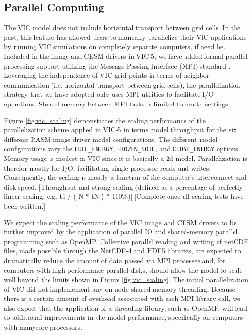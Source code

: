 \documentclass[gmd, manuscript]{copernicus}
\begin{document}
  \subsection{Parallel Computing}
    \label{sec:mpi}
    The VIC model does not include horizontal transport between grid cells.
    In the past, this feature has allowed users to manually parallelize their VIC applications by running VIC simulations on completely separate computers, if need be.
    Included in the image and CESM drivers in VIC-5, we have added formal parallel processing support utilizing the Message Passing Interface (MPI) standard \citep{Gropp_1996}.
    Leveraging the independence of VIC grid points in terms of neighbor communication (i.e. horizontal transport between grid cells), the parallelization strategy that we have adopted only uses MPI utilities to facilitate I/O operations.
    Shared memory between MPI tasks is limited to model settings.

    Figure \ref{fig:vic_scaling} demonstrates the scaling performance of the parallelization scheme applied in VIC-5 in terms model throughput for the six different RASM image driver model configurations.
    The different model configurations vary the \verb|FULL_ENERGY|, \verb|FROZEN_SOIL|, and \verb|CLOSE_ENERGY| options.
    Memory usage is modest in VIC since it is basically a 2d model.
    Parallelization is therefor mostly for I/O, facilitating single processor reads and writes.
    Consequently, the scaling is mostly a function of the computer's interconnect and disk speed.
    [Throughput and strong scaling (defined as a percentage of perfectly linear scaling, e.g.  t1 / ( N * tN ) * 100\%)]
    [Complete once all scaling tests have been written.]

    We expect the scaling performance of the VIC image and CESM drivers to be further improved by the application of parallel IO and shared-memory parallel programming such as OpenMP.
    Collective parallel reading and writing of netCDF files, made possible through the NetCDF-4 and HDF5 libraries, are expected to dramatically reduce the amount of data passed via MPI processes and, for computers with high-performance parallel disks, should allow the model to scale well beyond the limits shown in Figure \ref{fig:vic_scaling}.
    The initial parallelization of VIC did not implemement any on-node shared-memory threading.
    Because there is a certain amount of overhead associated with each MPI library call, we also expect that the application of a threading library, such as OpenMP, will lead to additional improvements in the model performance, specifically on computers with manycore processors.
\end{document}

